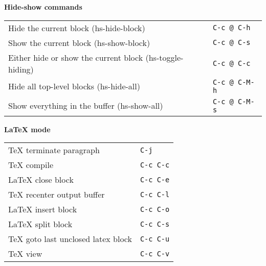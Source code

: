 \documentclass[a4paper,10pt,landscape,twocolumn]{article}
\newcommand{\keydescr}[2]{\small #2 & \small \texttt{#1} \\ }
\newenvironment{mykeys}[1]
               {\large{\textbf{#1}}\nopagebreak \medskip \\
                 \begin{tabular}{p{8cm}l} }
               {  \end{tabular} \bigskip }
\begin{document}
\begin{mykeys}{Hide-show commands}
  \keydescr{C-c @ C-h}
           {Hide the current block \mbox{(hs-hide-block)}}
  \keydescr{C-c @ C-s}
                    {Show the current block \mbox{(hs-show-block)}}
  \keydescr{C-c @ C-c}
           {Either hide or show the current block \mbox{(hs-toggle-hiding)}}
  \keydescr{C-c @ C-M-h}
           {Hide all top-level blocks \mbox{(hs-hide-all)}}
  \keydescr{C-c @ C-M-s}
           {Show everything in the buffer \mbox{(hs-show-all)}}
\end{mykeys}

\begin{mykeys}{\LaTeX{} mode}
 \keydescr{C-j}
          {\TeX{} terminate paragraph}
 \keydescr{C-c C-c}
          {\TeX{} compile}
 \keydescr{C-c C-e}
          {\LaTeX{} close block}
 \keydescr{C-c C-l}
          {\TeX{} recenter output buffer}
 \keydescr{C-c C-o}
          {\LaTeX{} insert block}
 \keydescr{C-c C-s}
          {\LaTeX{} split block}
 \keydescr{C-c C-u} 
          {\TeX{} goto last unclosed latex block}
 \keydescr{C-c C-v}
          {\TeX{} view}
\end{mykeys}
\end{document}
